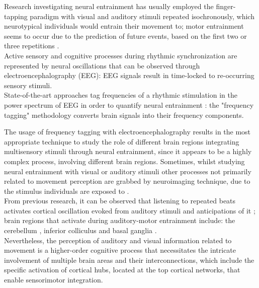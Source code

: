 Research investigating neural entrainment has usually employed the finger-tapping paradigm with visual and auditory stimuli repeated isochronously, which neurotypical individuals would entrain their movement to; motor entrainment seems to occur due to the prediction of future events, based on the first two or three repetitions \parencite{Schmidt_1997}. \\
Active sensory and cognitive processes during rhythmic synchronization are represented by neural oscillations that can be observed through electroencephalography (EEG): EEG signals result in time-locked to re-occurring sensory stimuli. \\
State-of-the-art approaches tag frequencies of a rhythmic stimulation in the power spectrum of EEG in order to quantify neural entrainment \parencite{Nozaradan_2011}: the "frequency tagging" methodology converts brain signals into their frequency components. 

The usage of frequency tagging with electroencephalography results in the most appropriate technique to study the role of different brain regions integrating multisensory stimuli through neural entrainment, since it appears to be a highly complex process, involving different brain regions. Sometimes, whilst studying neural entrainment with visual or auditory stimuli other processes not primarily related to movement perception are grabbed by neuroimaging technique, due to the stimulus individuals are exposed to \parencite{Oomen_2022}. \\
From previous research, it can be observed that listening to repeated beats activates cortical oscillation evoked from auditory stimuli and anticipations of it \parencite{Snyder_2005}; brain regions that activate during auditory-motor entrainment include: the cerebellum \parencite{Grahn_2011}, inferior colliculus \parencite{Tierney_2013} and basal ganglia \parencite{Thaut_2009}. \\
Nevertheless, the perception of auditory and visual information related to movement is a higher-order cognitive process that necessitates the intricate involvement of multiple brain areas and their interconnections, which include the specific activation of cortical hubs, located at the top cortical networks, that enable sensorimotor integration.

